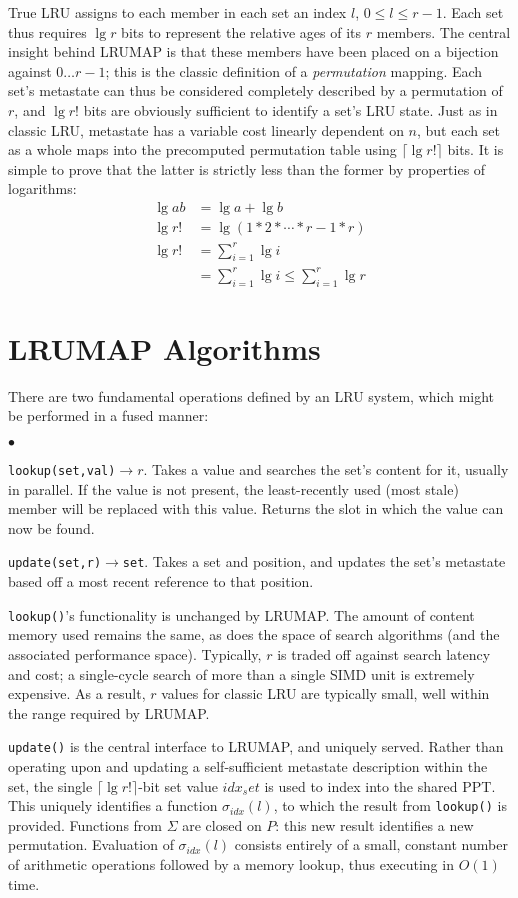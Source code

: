 \documentclass[10pt]{sigplanconf}
\newcommand{\squishlist}{\begin{list}{$\bullet$}
  {\setlength{\itemsep}{0pt}
    \setlength{\parsep}{3pt}
    \setlength{\topsep}{3pt}
    \setlength{\partopsep}{0pt}
    \setlength{\leftmargin}{1.5em}
    \setlength{\labelwidth}{1em}
    \setlength{\labelsep}{0.5em}
  } }
\newcommand{\squishend}{\end{list}}
\begin{document}
True LRU assigns to each member in each set an index $l$, $0\le{l}\le{r-1}$.
Each set thus requires $\lg{r}$ bits to represent the relative ages of its $r$
members. The central insight behind LRUMAP is that these members have been
placed on a bijection against $0\dotsc{r-1}$; this is the classic definition of
a \textit{permutation} mapping. Each set's metastate can thus be considered
completely described by a permutation of $r$, and $\lg{r!}$ bits are obviously
sufficient to identify a set's LRU state. Just as in classic LRU, metastate has
a variable cost linearly dependent on $n$, but each set as a whole maps into
the precomputed permutation table using $\lceil\lg{r!}\rceil$ bits. It is
simple to prove that the latter is strictly less than the former by properties
of logarithms:
\begin{align*}
\lg{ab} &= \lg{a} + \lg{b} \\
\lg{r!} &= \lg{(1*2*\dotsb*r-1*r)} \\
\lg{r!} &= \sum_{i=1}^{r}{\lg{i}} \\
&= \sum_{i=1}^{r}{\lg{i}} \le \sum_{i=1}^{r}{\lg{r}}
\end{align*}
\section{LRUMAP Algorithms}
There are two fundamental operations defined by an LRU system, which might be
performed in a fused manner:
\squishlist
\item \texttt{lookup(set,val)}$\rightarrow{r}$. Takes a value and searches the
set's content for it, usually in parallel. If the value is not present, the
least-recently used (most stale) member will be replaced with this value.
Returns the slot in which the value can now be found.
\item \texttt{update(set,r)}$\rightarrow$\texttt{set}. Takes a set and
position, and updates the set's metastate based off a most recent reference to
that position.
\squishend
\texttt{lookup()}'s functionality is unchanged by LRUMAP. The amount of content
memory used remains the same, as does the space of search algorithms (and the
associated performance space). Typically, $r$ is traded off against search
latency and cost; a single-cycle search of more than a single SIMD unit is
extremely expensive. As a result, $r$ values for classic LRU are typically
small, well within the range required by LRUMAP.

\texttt{update()} is the central interface to LRUMAP, and uniquely served. Rather
than operating upon and updating a self-sufficient metastate description within
the set, the single $\lceil\lg{r!}\rceil$-bit set value $idx_set$ is used to index into
the shared PPT. This uniquely identifies a function $\sigma_{idx}(l)$, to which
the result from \texttt{lookup()} is provided. Functions from $\Sigma$ are
closed on $P$: this new result identifies a new permutation. Evaluation of
$\sigma_{idx}(l)$ consists entirely of a small, constant number of arithmetic
operations followed by a memory lookup, thus executing in $O(1)$ time.
\end{document}
